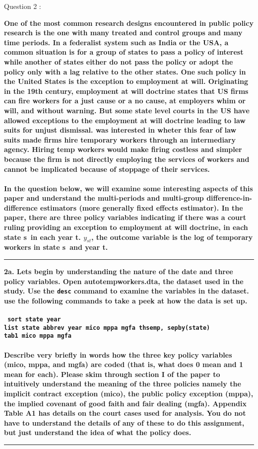 \documentclass[12pt]{article}
\newcommand\question[1]{\vspace{1em}\hrule\vspace{1em}\textbf{#1}\vspace{1em}\hrule\vspace{1em}}
\begin{document}
\newpage
\begin{center}\LARGE{Question 2 : \cite{Autor2003}}\end{center}
\textbf{One of the most common research designs encountered in public policy research is the one with many treated and control groups and many time periods. In a federalist system such as India or the USA, a common situation is for a group of states to pass a policy of interest while another of states either do not pass the policy or adopt the policy only with a lag relative to the other states. One such policy in the United States is the exception to employment at will. Originating in the 19th century, employment at will doctrine states that US firms can fire workers for a just cause or a no cause, at employer\textquotesingle s whim or will, and without warning. But some state level courts in the US have allowed exceptions to the employment at will doctrine leading to law suits for unjust dismissal. \cite{Autor2003} was interested in wheter this fear of law suits made firms hire temporary workers through an intermediary agency. Hiring temp workers would make firing costless and simpler because the firm is not directly employing the services of workers and cannot be implicated because of stoppage of their services.\\\\In the question below, we will examine some interesting aspects of this paper and understand the multi-periods and multi-group difference-in-difference estimators (more generally fixed effects estimator). In the paper, there are three policy variables indicating if there was a court ruling providing an exception to employment at will doctrine, in each state \textquotesingle s\textquotesingle \ in each year \textquotesingle t\textquotesingle . $y_{st}$, the outcome variable is the log of temporary workers in state \textquotesingle s\textquotesingle \ and year  \textquotesingle t\textquotesingle .}

\newpage
\question{2a. Let\textquotesingle s begin by understanding the nature of the date and three policy variables. Open autotempworkers.dta, the dataset used in the study. Use the \texttt{desc} command to examine the variables in the dataset. use the following commands to take a peek at how the data is set up.\\\\
\texttt{ sort state year\\list state abbrev year mico mppa mgfa thsemp, sepby(state)\\tab1 mico mppa mgfa\\\\} Describe very briefly in words how the three key policy variables (mico, mppa, and mgfa) are coded (that is, what does 0 mean and 1 mean for each). Please skim through section I of the paper to intuitively understand the meaning of the three policies namely the implicit contract exception (mico), the public policy exception (mppa), the implied covenant of good faith and fair dealing (mgfa). Appendix Table A1 has details on the court cases used for analysis. You do not have to understand the details of any of these to do this assignment, but just understand the idea of what the policy does.}
\end{document}

